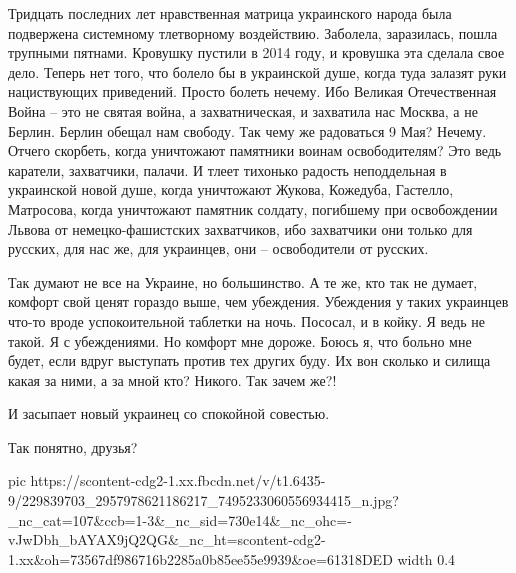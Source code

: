 Тридцать последних лет нравственная матрица украинского народа была подвержена
системному тлетворному воздействию. Заболела, заразилась, пошла трупными
пятнами. Кровушку пустили в 2014 году, и кровушка эта сделала свое дело. Теперь
нет того, что болело бы в украинской душе, когда туда залазят руки нациствующих
приведений. Просто болеть нечему. Ибо Великая Отечественная Война – это не
святая война, а захватническая, и захватила нас Москва, а не Берлин. Берлин
обещал нам свободу. Так чему же радоваться 9 Мая? Нечему. Отчего скорбеть,
когда уничтожают памятники воинам освободителям? Это ведь каратели, захватчики,
палачи. И тлеет тихонько радость неподдельная в украинской новой душе, когда
уничтожают Жукова, Кожедуба, Гастелло, Матросова, когда уничтожают памятник
солдату, погибшему при освобождении Львова от немецко-фашистских захватчиков,
ибо захватчики они только для русских, для нас же, для украинцев, они –
освободители от русских. 

Так думают не все на Украине, но большинство. А те же, кто так не думает,
комфорт свой ценят гораздо выше, чем убеждения. Убеждения у таких украинцев
что-то вроде успокоительной таблетки на ночь. Пососал, и в койку. Я ведь не
такой. Я с убеждениями. Но комфорт мне дороже. Боюсь я, что больно мне будет,
если вдруг выступать против тех других буду. Их вон сколько и силища какая за
ними, а за мной кто? Никого. Так зачем же?!

И засыпает новый украинец со спокойной совестью. 

Так понятно, друзья?

\ifcmt
  pic https://scontent-cdg2-1.xx.fbcdn.net/v/t1.6435-9/229839703_2957978621186217_7495233060556934415_n.jpg?_nc_cat=107&ccb=1-3&_nc_sid=730e14&_nc_ohc=-vJwDbh_bAYAX9jQ2QG&_nc_ht=scontent-cdg2-1.xx&oh=73567df986716b2285a0b85ee55e9939&oe=61318DED
  width 0.4
\fi
